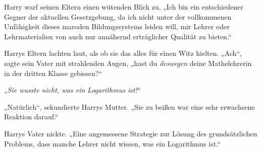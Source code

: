 Harry warf seinen Eltern einen wütenden Blick zu. „Ich bin ein entschiedener Gegner der aktuellen Gesetzgebung, da ich nicht unter der vollkommenen Unfähigkeit dieses maroden Bildungssystems leiden will, mir Lehrer oder Lehrmaterialien von auch nur annähernd erträglicher Qualität zu bieten.“

Harrys Eltern lachten laut, als ob sie das alles für einen Witz hielten. „Ach“, sagte sein Vater mit strahlenden Augen, „hast du \emph{deswegen} deine Mathelehrerin in der dritten Klasse gebissen?“

„\emph{Sie wusste nicht, was ein Logarithmus ist!}“

„Natürlich“, sekundierte Harrys Mutter. „Sie zu beißen war eine sehr erwachsene Reaktion darauf.“

Harrys Vater nickte. „Eine angemessene Strategie zur Lösung des grundsätzlichen Problems, dass manche Lehrer nicht wissen, was ein Logarithmus ist.“

